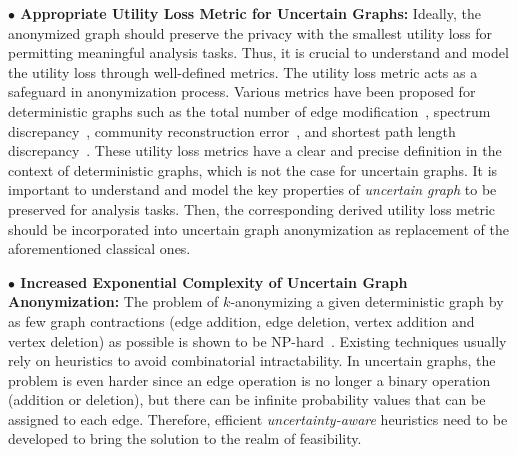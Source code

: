 \vspace{2mm}\hspace{-1em}
\textbf{$\bullet$ Appropriate Utility Loss Metric for Uncertain Graphs:} 
Ideally, the anonymized graph should preserve the privacy with the smallest utility loss for permitting meaningful analysis tasks. Thus, it is crucial to understand and model the utility loss through well-defined metrics. The utility loss metric acts as a safeguard in anonymization process. Various metrics have been proposed for deterministic graphs such as the total number of edge modification~\cite{Boldi_Injecting_2012,Liu_Towards_2008}, spectrum discrepancy~\cite{Ying_Randomizing_2008}, 
community reconstruction error~\cite{Wang2011,Ninggal_Utility_2015}, and 
shortest path length discrepancy~\cite{Liu_Privacy_2009}. 
These utility loss metrics have a clear and precise definition in the context of deterministic graphs, which is not the case 
for uncertain graphs. It is important to understand and model the key properties of {\em uncertain graph} to be preserved for analysis tasks. Then, the corresponding derived utility loss metric should be incorporated into uncertain graph anonymization as replacement of the aforementioned classical ones. 

\vspace{2mm}\hspace{-1em}
\textbf{$\bullet$ Increased Exponential Complexity of Uncertain Graph Anonymization:}
The problem of $k$-anonymizing a given deterministic graph by as few graph contractions (edge addition, edge deletion, vertex addition and vertex deletion) as possible is shown to be NP-hard~\cite{Hartung_Theory_2015}. Existing techniques usually rely on heuristics to avoid combinatorial
intractability. In uncertain graphs, the problem is even harder since an edge operation is no longer a binary operation (addition or deletion), but there can be infinite 
probability values that can be assigned to each edge. Therefore, efficient {\em uncertainty-aware} heuristics need to be developed to bring the solution to the realm of feasibility.



